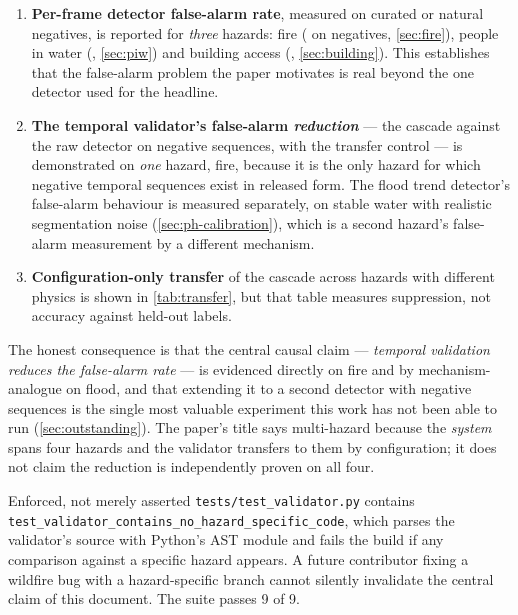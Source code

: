 \begin{enumerate}
  \item \textbf{Per-frame detector false-alarm rate}, measured on curated or
        natural negatives, is reported for \emph{three} hazards: fire
        (\FireImageFAR{} on \FireNegatives{} negatives, \cref{sec:fire}),
        people in water (\SwimmerImageFAR, \cref{sec:piw}) and building
        access (\BuildingImageFAR, \cref{sec:building}). This establishes
        that the false-alarm problem the paper motivates is real beyond the
        one detector used for the headline.
  \item \textbf{The temporal validator's false-alarm \emph{reduction}} — the
        cascade against the raw detector on negative sequences, with the
        transfer control — is demonstrated on \emph{one} hazard, fire,
        because it is the only hazard for which negative temporal sequences
        exist in released form. The flood trend detector's false-alarm
        behaviour is measured separately, on stable water with realistic
        segmentation noise (\cref{sec:ph-calibration}), which is a second
        hazard's false-alarm measurement by a different mechanism.
  \item \textbf{Configuration-only transfer} of the cascade across hazards
        with different physics is shown in \cref{tab:transfer}, but that
        table measures suppression, not accuracy against held-out labels.
\end{enumerate}

The honest consequence is that the central causal claim — \emph{temporal
validation reduces the false-alarm rate} — is evidenced directly on fire and
by mechanism-analogue on flood, and that extending it to a second detector
with negative sequences is the single most valuable experiment this work has
not been able to run (\cref{sec:outstanding}). The paper's title says
multi-hazard because the \emph{system} spans four hazards and the validator
transfers to them by configuration; it does not claim the reduction is
independently proven on all four.

\begin{recorded}{Enforced, not merely asserted}
\texttt{tests/test\_validator.py} contains
\texttt{test\_validator\_contains\_no\_hazard\_specific\_code}, which parses
the validator's source with Python's AST module and fails the build if any
comparison against a specific hazard appears. A future contributor fixing a
wildfire bug with a hazard-specific branch cannot silently invalidate the
central claim of this document. The suite passes 9 of 9.
\end{recorded}
